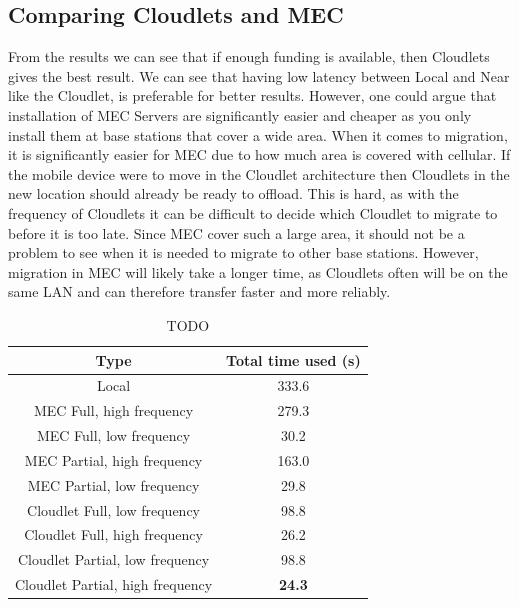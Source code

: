 
\subsection{Comparing Cloudlets and MEC}
From the results we can see that if enough funding is available, then Cloudlets gives the best result. We can see that having low latency between Local and Near like the Cloudlet, is preferable for better results. However, one could argue that installation of MEC Servers are significantly easier and cheaper as you only install them at base stations that cover a wide area. When it comes to migration, it is significantly easier for MEC due to how much area is covered with cellular. If the mobile device were to move in the Cloudlet architecture then Cloudlets in the new location should already be ready to offload. This is hard, as with the frequency of Cloudlets it can be difficult to decide which Cloudlet to migrate to before it is too late. Since MEC cover such a large area, it should not be a problem to see when it is needed to migrate to other base stations. However, migration in MEC will likely take a longer time, as Cloudlets often will be on the same LAN and can therefore transfer faster and more reliably.

\begin{table}[]
    \centering
    \begin{tabular}{|c|c|}
        \hline
       Type  & Total time used (s)\\
       \hline
       \hline
       Local                            & 333.6  \\
       \hline
       MEC Full, high frequency         & 279.3 \\
       \hline
       MEC Full, low frequency         & 30.2 \\
       \hline
       MEC Partial, high frequency      & 163.0 \\
       \hline
       MEC Partial, low frequency      & 29.8 \\
       \hline
       Cloudlet Full, low frequency    & 98.8 \\
       \hline
       Cloudlet Full, high frequency    & 26.2 \\
       \hline
       Cloudlet Partial, low frequency    & 98.8 \\
       \hline
       Cloudlet Partial, high frequency    & \textbf{24.3} \\
       \hline
    \end{tabular}
    \caption{TODO}
    \label{tab:total_time_compare}
\end{table}

